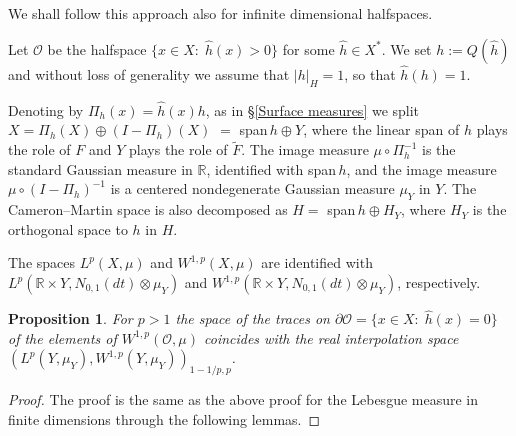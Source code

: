 \documentclass[reqno,twoside,12pt]{amsart}
\newtheorem{Proposition}[Theorem]{Proposition}
\begin{document}
We shall follow this approach also for infinite dimensional halfspaces. 

Let  ${\mathcal O}$ be the halfspace  $\{x\in X: \; \hat{h}(x) > 0\}$  for some $\hat{h}\in X^*$. We set  $h := Q(\hat{h})$ and without loss of generality we assume that   $|h|_H=1$, so that $\hat{h}(h)=1$. 

Denoting by $\Pi_h(x) = \hat{h}(x)h$, as
in \S \ref{Surface measures} we split $X = \Pi_h(X) \oplus (I-\Pi_h)(X)$ $=$  span$\,h \oplus Y$,  
 where the linear span of $h$ plays the role of $F$ and $Y$ plays the role of $\widetilde{F}$. 
The image measure  $\mu \circ \Pi_h ^{-1}$ is the standard Gaussian measure in ${\mathbb R}$, identified with  span$\,h$, and the image measure $\mu \circ (I-\Pi _h)^{-1}$  is a centered nondegenerate Gaussian measure $\mu_Y$ in $Y$. The Cameron--Martin space is also decomposed as $H= $  span$\,h \oplus H_Y$,  where $H_Y$ is the orthogonal space to $h$ in $H$.  

The spaces $L^{p}(X, \mu)$ and  $W^{1,p}(X, \mu)$ are identified with $L^{p}({\mathbb R} \times Y,N_{0,1}(dt) \otimes  \mu_Y)$ and $W^{1,p}({\mathbb R} \times Y,N_{0,1}(dt) \otimes  \mu_Y)$, respectively. 
 
 
 
 
 \begin{Proposition}
For $p>1$ the space of the traces on $\partial {\mathcal O} = \{x\in X: \; \hat{h}(x) = 0\}$ of the elements of $W^{1,p}({\mathcal O}, \mu)$ coincides with the real  interpolation space $(L^{p}(Y,  \mu_Y), W^{1,p}(Y,  \mu_Y))_{1-1/p, p}$. 
\end{Proposition}
\begin{proof} The proof is the same as the above  proof for the Lebesgue measure in finite dimensions through the following lemmas.  \end{proof}
\end{document}
